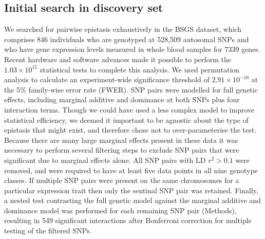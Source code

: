 \documentclass{article}
\begin{document}
\subsection{Initial search in discovery set}
We searched for pairwise epistasis exhaustively in the BSGS dataset, which comprises 846 individuals who are genotyped at 528,509 autosomal SNPs and who have gene expression levels measured in whole blood samples for 7339 genes. Recent hardware and software advances made it possible to perform the $1.03 \times 10^{15}$ statistical tests to complete this analysis. We used permutation analysis to calculate an experiment-wide significance threshold of $2.91 \times 10^{-16}$ at the 5\% family-wise error rate (FWER). SNP pairs were modelled for full genetic effects, including marginal additive and dominance at both SNPs plus four interaction terms. Though we could have used a less complex model to improve statistical efficiency, we deemed it important to be agnostic about the type of epistasis that might exist, and therefore chose not to over-parameterise the test. Because there are many large marginal effects present in these data it was necessary to perform several filtering steps to exclude SNP pairs that were significant due to marginal effects alone. All SNP pairs with LD $r^2 > 0.1$ were removed, and were required to have at least five data points in all nine genotype classes. If multiple SNP pairs were present on the same chromosomes for a particular expression trait then only the sentinal SNP pair was retained. Finally, a nested test contrasting the full genetic model against the marginal additive and dominance model was performed for each remaining SNP pair (Methods), resulting in 549 significant interactions after Bonferroni correction for multiple testing of the filtered SNPs.
\end{document}
